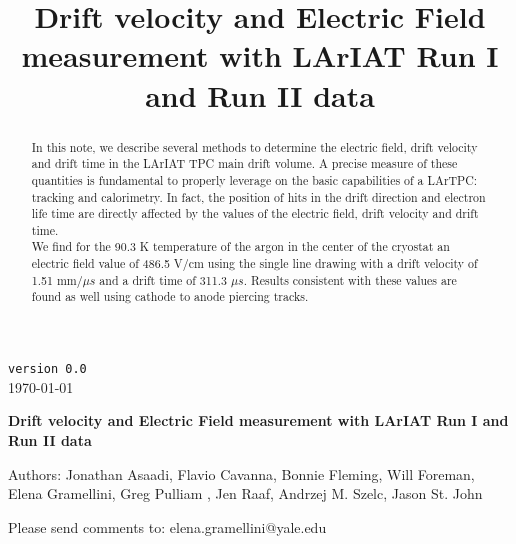 \documentclass[a4paper]{article}
\title{Drift velocity and Electric Field measurement with LArIAT Run I and Run II data}
\begin{document}
\def\Journal#1#2#3#4{{#1} {\bf #2}, #3 (#4)}
\def\etal{{\it et\ al.}}
\def\numunue{\nu_\mu\rightarrow\nu_e}
\def\numunutau{\nu_\mu\rightarrow\nu_\tau}
\def\nuebar{\bar\nu_e}
\def\nue{\nu_e}
\def\nutau{\nu_\tau}
\def\numubar{\bar\nu_\mu}
\def\numu{\nu_\mu}
\def\ra{\rightarrow}
\def\numubarnuebar{\bar\nu_\mu\rightarrow\bar\nu_e}
\def\nuebarnumubar{\bar\nu_e\rightarrow\bar\nu_\mu}
\def\osc{\rightsquigarrow}
\def\inteni{{\cal I}_{pot}}
\def\fmerit{{\cal F}}
\begin{flushright}
{\tt version 0.0}\\ 
\today
\end{flushright}
\vspace*{0.6cm}
\linenumbers
\begin{center}
{\Large \bf Drift velocity and Electric Field measurement with LArIAT Run I and Run II data} 
\vspace*{1.6cm}
\setcounter{footnote}{0}  
\def\A{\kern+.6ex\lower.42ex\hbox{$\scriptstyle \iota$}\kern-1.20ex a}
\def\E{\kern+.5ex\lower.42ex\hbox{$\scriptstyle \iota$}\kern-1.10ex e}
\small
\newcommand{\Aname}[2]{#1}
\def\titlefoot#1{\vspace{-0.3cm}\begin{center}{\bf #1}\end{center}}

Authors: Jonathan Asaadi, Flavio Cavanna, Bonnie Fleming, Will Foreman, Elena Gramellini,  Greg Pulliam , Jen Raaf, Andrzej M. Szelc,   Jason St. John\\

\end{center}
\vspace*{1cm}

\noindent Please send comments to: elena.gramellini@yale.edu


\begin{abstract}
In this note, we describe several methods to determine the electric field, drift velocity and drift time in the LArIAT TPC main drift volume. 
A precise measure of these quantities is fundamental to properly leverage on the basic capabilities of a LArTPC: tracking and calorimetry. In fact, the position of hits in the drift direction and electron life time are directly affected by the values of the electric field, drift velocity and drift time.\\

We find for the 90.3 K temperature of the argon in the center of the cryostat an electric field value of 486.5 V/cm using the single line drawing with a drift velocity of 1.51 mm/$\mu s$ and a drift time of 311.3 $\mu s$. Results consistent with these values are found as well using cathode to anode piercing tracks.

\end{abstract} 
\end{document}
